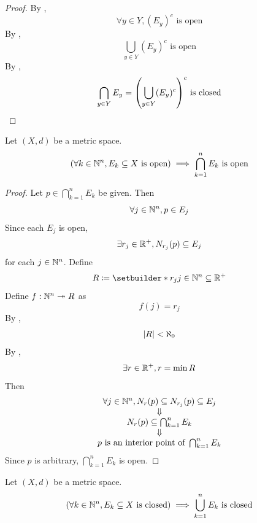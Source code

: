 \begin{proof}
    By ,
    \[
    \forall y \in Y, (E_{y})^{c} \text{ is open}
    \]
    By ,
    \[
    \bigcup_{y \in Y} (E_{y})^{c} \text{ is open}
    \]
    By ,
    \[
    \bigcap_{y \in Y} E_{y} = \paren*{\bigcup_{y \in Y} (E_{y})^{c}}^{c} \text{ is closed}
    \]
\end{proof}

\bigskip

\begin{theorem} \label{an:thm:finite-intersection-of-open-sets-is-open}
    Let $(X, d)$ be a metric space.
    \[
    \paren*{\forall k \in \N^{n}, E_{k} \subseteq X \text{ is open}} \implies \bigcap_{k = 1}^{n} E_{k} \text{ is open}
    \]
\end{theorem}

\begin{proof}
    Let $p \in \bigcap_{k = 1}^{n} E_{k}$ be given. Then
    \[
    \forall j \in \N^{n}, p \in E_{j}
    \]
    Since each $E_{j}$ is open,
    \[
    \exists r_{j} \in \R^{+}, N_{r_{j}}(p) \subseteq E_{j}
    \]
    for each $j \in \N^{n}$. Define
    \[
    R \coloneqq \setbuilder*{r_{j}}{j \in \N^{n}} \subseteq \R^{+}
    \]
    Define $f: \N^{n} \twoheadrightarrow R$ as
    \[
    f(j) = r_{j}
    \]
    By ,
    \[
    \abs*{R} < \aleph_{0}
    \]
    By ,
    \[
    \exists r \in \R^{+}, r = \min R
    \]
    Then
    \[
    \begin{array}{c}
        \forall j \in \N^{n}, N_{r}(p) \subseteq N_{r_{j}}(p) \subseteq E_{j} \\
        \Downarrow \\
        N_{r}(p) \subseteq \bigcap_{k = 1}^{n} E_{k} \\
        \Downarrow \\
        p \text{ is an interior point of } \bigcap_{k = 1}^{n} E_{k}
    \end{array}
    \]
    Since $p$ is arbitrary, $\bigcap_{k = 1}^{n} E_{k}$ is open.
\end{proof}

\bigskip

\begin{corollary} \label{an:cor:finite-union-of-closed-sets-is-closed}
    Let $(X, d)$ be a metric space.
    \[
    \paren*{\forall k \in \N^{n}, E_{k} \subseteq X \text{ is closed}} \implies \bigcup_{k = 1}^{n} E_{k} \text{ is closed}
    \]
\end{corollary}
